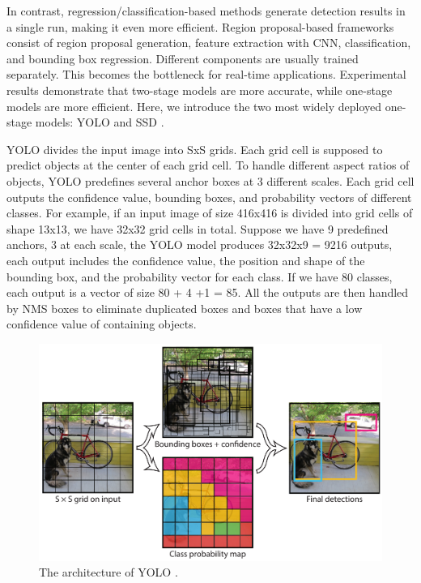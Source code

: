 
In contrast, regression/classification-based methods generate detection results in a single run, making it even more efficient. Region proposal-based frameworks consist of region proposal generation, feature extraction with CNN, classification, and bounding box regression. Different components are usually trained separately. This becomes the bottleneck for real-time applications.  Experimental results demonstrate that two-stage models are more accurate, while one-stage models are more efficient. Here, we introduce the two most widely deployed one-stage models: YOLO \cite{redmon2016you} and SSD \cite{liu2016ssd}. 

YOLO divides the input image into SxS grids. Each grid cell is supposed to predict objects at the center of each grid cell. To handle different aspect ratios of objects, YOLO predefines several anchor boxes at 3 different scales. Each grid cell outputs the confidence value, bounding boxes, and probability vectors of different classes. For example, if an input image of size 416x416 is divided into grid cells of shape 13x13, we have 32x32 grid cells in total. Suppose we have 9 predefined anchors, 3 at each scale, the YOLO model produces 32x32x9 = 9216 outputs, each output includes the confidence value, the position and shape of the bounding box, and the probability vector for each class. If we have 80 classes, each output is a vector of size 80 + 4 +1 = 85. All the outputs are then handled by NMS boxes to eliminate duplicated boxes and boxes that have a low confidence value of containing objects.

\begin{figure}[H]
\centering
\includegraphics[scale=0.6]{figures/chapter_detection/yolo.png}
\caption{The architecture of YOLO \cite{redmon2016you}.}
\label{fig.yolo}
\end{figure}


